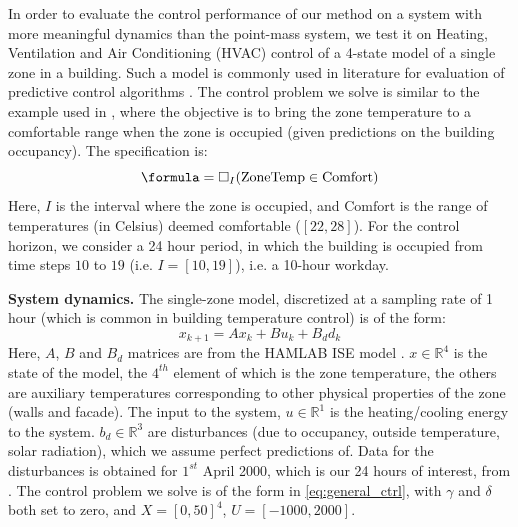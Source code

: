
In order to evaluate the control performance of our method on a system with more meaningful dynamics than the point-mass system, we test it on Heating, Ventilation and Air Conditioning (HVAC) control of a 4-state model of a single zone in a building. Such a model is commonly used in literature for evaluation of predictive control algorithms \cite{Jain2016}. The control problem we solve is similar to the example used in \cite{Raman14_MPCSTL}, where the objective is to bring the zone temperature to a comfortable range when the zone is occupied (given predictions on the building occupancy). The specification is:
\begin{equation}
\label{eq:BldgSpec}
\formula = \always_I(\text{ZoneTemp} \in \text{Comfort})
\end{equation}
Here, $I$ is the interval where the zone is occupied, and $\text{Comfort}$ is the range of temperatures (in Celsius) deemed comfortable ($[22,28]$). For the control horizon, we consider a 24 hour period, in which the building is occupied from time steps $10$ to $19$ (i.e. $I=[10,19]$), i.e. a 10-hour workday. 

\textbf{System dynamics.} The single-zone model, discretized at a sampling rate of 1 hour (which is common in building temperature control) is of the form:
\begin{equation}
\label{eq:bldg_dyn}
x_{k+1} = Ax_{k}+Bu_k+B_dd_k
\end{equation}
Here, $A$, $B$ and $B_d$ matrices are from the HAMLAB ISE model \cite{VanSchijndel2005}. $x \in \mathbb{R}^4$ is the state of the model, the $4^{th}$ element of which is the zone temperature, the others are auxiliary temperatures corresponding to other physical properties of the zone (walls and facade). The input to the system, $u \in \mathbb{R}^1$ is the heating/cooling energy to the system. $b_d \in \mathbb{R}^3$ are disturbances (due to occupancy, outside temperature, solar radiation), which we assume perfect predictions of. Data for the disturbances is obtained for $1^{st}$ April 2000, which is our 24 hours of interest, from \cite{VanSchijndel2005}. The control problem we solve is of the form in \eqref{eq:general_ctrl}, with $\gamma$ and $\delta$ both set to zero, and $X=[0,50]^4$, $U=[-1000,2000]$.

